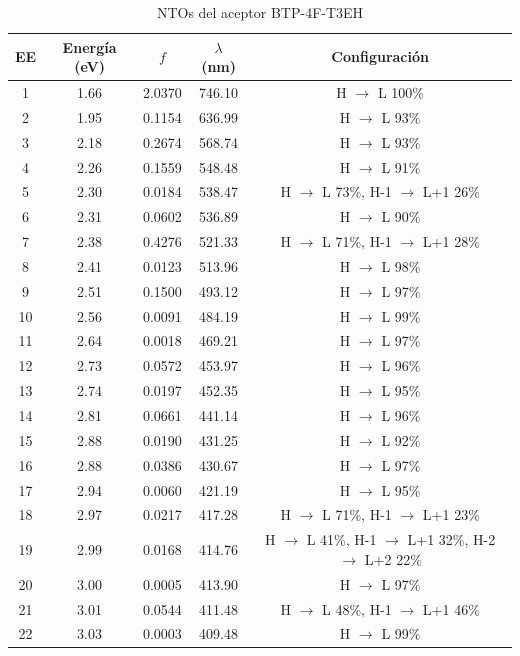 \begin{table}[H]
\caption{NTOs del aceptor BTP-4F-T3EH}
\label{table:R25B-5} \vspace{-0.5cm}
{\footnotesize
\begin{center} 
\begin{tabular}{ccccc}
\hline
EE & Energía (eV) & $f$ & $\lambda$ (nm) & Configuración \\ \hline
1 & 1.66 & 2.0370 & 746.10 & H $\rightarrow$ L 100\% \\
2 & 1.95 & 0.1154 & 636.99 & H $\rightarrow$ L 93\% \\
3 & 2.18 & 0.2674 & 568.74 & H $\rightarrow$ L 93\% \\
4 & 2.26 & 0.1559 & 548.48 & H $\rightarrow$ L 91\% \\
5 & 2.30 & 0.0184 & 538.47 & H $\rightarrow$ L 73\%, H-1 $\rightarrow$ L+1 26\% \\
6 & 2.31 & 0.0602 & 536.89 & H $\rightarrow$ L 90\% \\
7 & 2.38 & 0.4276 & 521.33 & H $\rightarrow$ L 71\%, H-1 $\rightarrow$ L+1 28\% \\
8 & 2.41 & 0.0123 & 513.96 & H $\rightarrow$ L 98\% \\
9 & 2.51 & 0.1500 & 493.12 & H $\rightarrow$ L 97\% \\
10 & 2.56 & 0.0091 & 484.19 & H $\rightarrow$ L 99\% \\
11 & 2.64 & 0.0018 & 469.21 & H $\rightarrow$ L 97\% \\
12 & 2.73 & 0.0572 & 453.97 & H $\rightarrow$ L 96\% \\
13 & 2.74 & 0.0197 & 452.35 & H $\rightarrow$ L 95\% \\
14 & 2.81 & 0.0661 & 441.14 & H $\rightarrow$ L 96\% \\
15 & 2.88 & 0.0190 & 431.25 & H $\rightarrow$ L 92\% \\
16 & 2.88 & 0.0386 & 430.67 & H $\rightarrow$ L 97\% \\
17 & 2.94 & 0.0060 & 421.19 & H $\rightarrow$ L 95\% \\
18 & 2.97 & 0.0217 & 417.28 & H $\rightarrow$ L 71\%, H-1 $\rightarrow$ L+1 23\% \\
19 & 2.99 & 0.0168 & 414.76 & H $\rightarrow$ L 41\%, H-1 $\rightarrow$ L+1 32\%, H-2 $\rightarrow$ L+2 22\% \\
20 & 3.00 & 0.0005 & 413.90 & H $\rightarrow$ L 97\% \\
21 & 3.01 & 0.0544 & 411.48 & H $\rightarrow$ L 48\%, H-1 $\rightarrow$ L+1 46\% \\
22 & 3.03 & 0.0003 & 409.48 & H $\rightarrow$ L 99\% \\

\end{tabular}
\end{center}}
\end{table}
